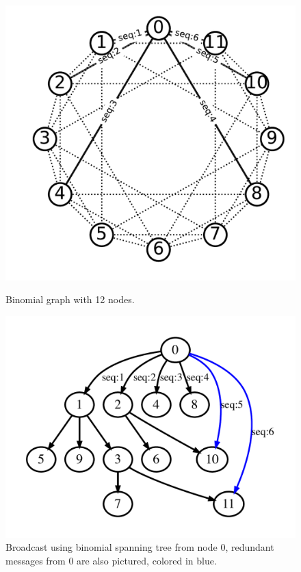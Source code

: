 \documentclass[sigconf]{acmart}
\begin{document}
\begin{figure}[ht!]
  \begin{minipage}{.45\textwidth}
    \centering
    \includegraphics[scale=.3]{BMG_seq.pdf}
    \caption{Binomial graph with 12 nodes.}
    \label{fig:bmg}
  \end{minipage}
  \begin{minipage}{.45\textwidth}
    \centering
    \includegraphics[scale=.3]{reorder_span.pdf}
    \caption{Broadcast using binomial spanning tree from node 0, redundant messages from 0 are also pictured, colored in blue.}
    \label{fig:reorder_span}
  \end{minipage}
\end{figure}
\end{document}
